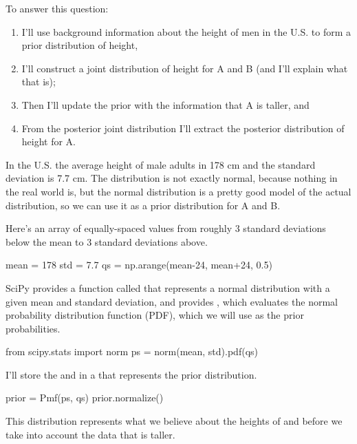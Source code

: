 \documentclass[12pt]{book}
\theoremstyle{exercise}
\begin{document}
To answer this question:

\begin{enumerate}

\item I'll use background information about the height of men in the U.S. to form a prior distribution of height,

\item I'll construct a joint distribution of height for A and B (and I'll explain what that is);

\item Then I'll update the prior with the information that A is taller, and 

\item From the posterior joint distribution I'll extract the posterior distribution of height for A.

\end{enumerate}

In the U.S. the average height of male adults in 178 cm and the standard deviation is 7.7 cm.  The distribution is not exactly normal, because nothing in the real world is, but the normal distribution is a pretty good model of the actual distribution, so we can use it as a prior distribution for A and B.

Here's an array of equally-spaced values from roughly 3 standard deviations below the mean to 3 standard deviations above.

\begin{code}
mean = 178
std = 7.7
qs = np.arange(mean-24, mean+24, 0.5)
\end{code}

SciPy provides a function called  that represents a normal distribution with a given mean and standard deviation, and provides , which evaluates the normal probability distribution function (PDF), which we will use as the prior probabilities.

\begin{code}
from scipy.stats import norm
ps = norm(mean, std).pdf(qs)
\end{code}

I'll store the  and  in a  that represents the prior distribution.

\begin{code}
prior = Pmf(ps, qs)
prior.normalize()
\end{code}

This distribution represents what we believe about the heights of  and  before we take into account the data that  is taller.
\end{document}
